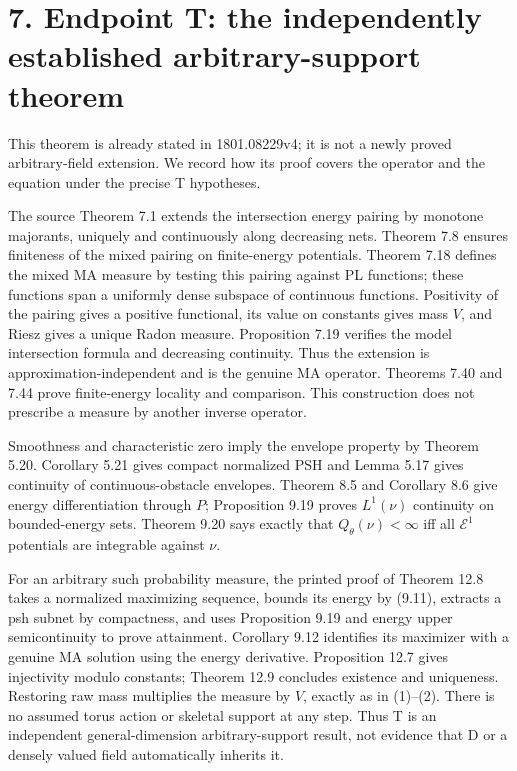 \documentclass[11pt]{article}
\begin{document}
\section*{7. Endpoint T: the independently established arbitrary-support theorem}

This theorem is already stated in 1801.08229v4; it is not a newly proved arbitrary-field extension. We record how its proof covers the operator and the equation under the precise T hypotheses.

The source Theorem 7.1 extends the intersection energy pairing by monotone majorants, uniquely and continuously along decreasing nets. Theorem 7.8 ensures finiteness of the mixed pairing on finite-energy potentials. Theorem 7.18 defines the mixed MA measure by testing this pairing against PL functions; these functions span a uniformly dense subspace of continuous functions. Positivity of the pairing gives a positive functional, its value on constants gives mass \(V\), and Riesz gives a unique Radon measure. Proposition 7.19 verifies the model intersection formula and decreasing continuity. Thus the extension is approximation-independent and is the genuine MA operator. Theorems 7.40 and 7.44 prove finite-energy locality and comparison. This construction does not prescribe a measure by another inverse operator.

Smoothness and characteristic zero imply the envelope property by Theorem 5.20. Corollary 5.21 gives compact normalized PSH and Lemma 5.17 gives continuity of continuous-obstacle envelopes. Theorem 8.5 and Corollary 8.6 give energy differentiation through \(P\); Proposition 9.19 proves \(L^1(\nu)\) continuity on bounded-energy sets. Theorem 9.20 says exactly that \(Q_\theta(\nu)<\infty\) iff all \(\mathcal E^1\) potentials are integrable against \(\nu\).

For an arbitrary such probability measure, the printed proof of Theorem 12.8 takes a normalized maximizing sequence, bounds its energy by (9.11), extracts a psh subnet by compactness, and uses Proposition 9.19 and energy upper semicontinuity to prove attainment. Corollary 9.12 identifies its maximizer with a genuine MA solution using the energy derivative. Proposition 12.7 gives injectivity modulo constants; Theorem 12.9 concludes existence and uniqueness. Restoring raw mass multiplies the measure by \(V\), exactly as in (1)--(2). There is no assumed torus action or skeletal support at any step. Thus T is an independent general-dimension arbitrary-support result, not evidence that D or a densely valued field automatically inherits it.
\end{document}
